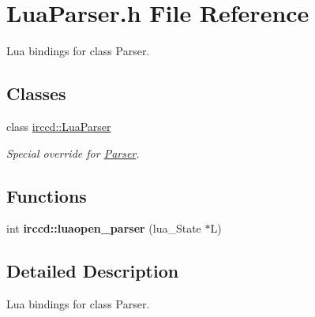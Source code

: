 \hypertarget{a00097}{\section{Lua\-Parser.\-h File Reference}
\label{a00097}
}


Lua bindings for class Parser.  


\subsection*{Classes}
\begin{DoxyCompactItemize}
\item 
class \hyperlink{a00046}{irccd\-::\-Lua\-Parser}
\begin{DoxyCompactList}\small\item\em Special override for \hyperlink{a00048}{Parser}. \end{DoxyCompactList}\end{DoxyCompactItemize}
\subsection*{Functions}
\begin{DoxyCompactItemize}
\item 
int {\bfseries irccd\-::luaopen\-\_\-parser} (lua\-\_\-\-State $\ast$L)
\end{DoxyCompactItemize}


\subsection{Detailed Description}
Lua bindings for class Parser. 